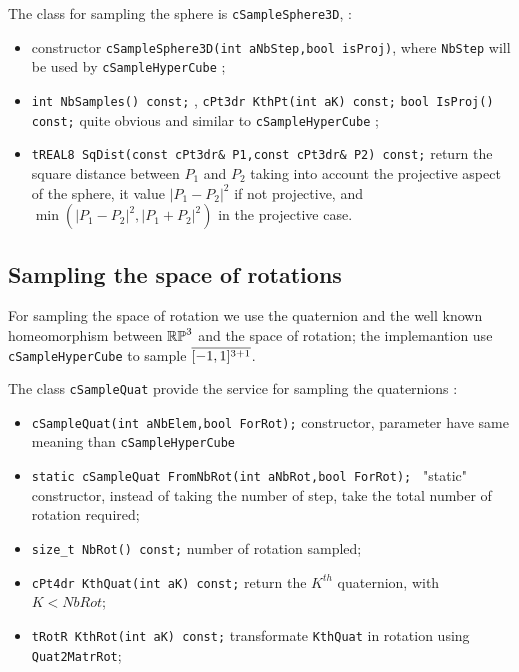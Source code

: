 The class for sampling the sphere is {\tt cSampleSphere3D},  :


\begin{itemize}
   \item constructor {\tt cSampleSphere3D(int aNbStep,bool isProj)}, where {\tt NbStep} will
         be used by {\tt cSampleHyperCube} ;

   \item {\tt int NbSamples() const;} , {\tt cPt3dr KthPt(int aK) const;} {\tt bool IsProj() const;}
         quite obvious and similar to {\tt cSampleHyperCube} ;

    \item {\tt tREAL8  SqDist(const cPt3dr\& P1,const cPt3dr\& P2) const;} return the square
          distance between $P_1$ and $P_2$ taking into account the projective aspect of the sphere,
          it value $|P_1-P_2|^2$ if not projective, and $\min(|P_1-P_2|^2,|P_1+P_2|^2)$ in the
          projective case.
\end{itemize}


\subsection{Sampling the space of rotations}

For sampling the space of rotation we use the quaternion and the well
known homeomorphism between $\mathbb{RP}^3$ and the space of rotation; the implemantion
use   {\tt cSampleHyperCube}  to sample $\overline{[-1,1]^{3 +1}}$.

The class {\tt cSampleQuat} provide the service for sampling the quaternions :

\begin{itemize}
   \item {\tt cSampleQuat(int aNbElem,bool ForRot);} constructor, parameter have same meaning than 
         {\tt cSampleHyperCube}

   \item {\tt static cSampleQuat FromNbRot(int aNbRot,bool ForRot); } "static" constructor,
         instead of taking the number of step, take the total number of rotation required;

   \item {\tt size\_t NbRot() const;} number of rotation sampled;

   \item {\tt cPt4dr  KthQuat(int aK) const;}  return the $K^{th}$ quaternion, with $K<NbRot$;
   \item {\tt tRotR   KthRot(int aK) const;} transformate {\tt KthQuat} in rotation using {\tt Quat2MatrRot};
\end{itemize}


